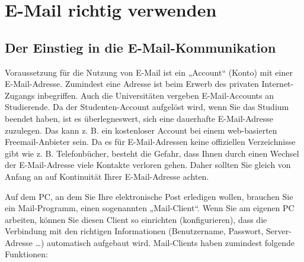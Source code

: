 \documentclass[]{book}
\theoremstyle{definition}
\theoremstyle{definition}
\theoremstyle{definition}
\theoremstyle{remark}
\begin{document}
\section{E-Mail richtig verwenden}\label{e-mail-richtig-verwenden}

\subsection{Der Einstieg in die
E-Mail-Kommunikation}\label{der-einstieg-in-die-e-mail-kommunikation}

Voraussetzung für die Nutzung von E-Mail ist ein „Account`` (Konto) mit
einer E-Mail-Adresse. Zumindest eine Adresse ist beim Erwerb des
privaten Internet-Zugangs inbegriffen. Auch die Universitäten vergeben
E-Mail-Accounts an Studierende. Da der Studenten-Account aufgelöst wird,
wenn Sie das Studium beendet haben, ist es überlegneswert, sich eine
dauerhafte E-Mail-Adresse zuzulegen. Das kann z. B. ein kostenloser
Account bei einem web-basierten Freemail-Anbieter sein. Da es für
E-Mail-Adressen keine offiziellen Verzeichnisse gibt wie z. B.
Telefonbücher, besteht die Gefahr, dass Ihnen durch einen Wechsel der
E-Mail-Adresse viele Kontakte verloren gehen. Daher sollten Sie gleich
von Anfang an auf Kontinuität Ihrer E-Mail-Adresse achten.

Auf dem PC, an dem Sie Ihre elektronische Post erledigen wollen,
brauchen Sie ein Mail-Programm, einen sogenannten „Mail-Client``. Wenn
Sie am eigenen PC arbeiten, können Sie diesen Client so einrichten
(konfigurieren), dass die Verbindung mit den richtigen Informationen
(Benutzername, Passwort, Server-Adresse \ldots{}) automatisch aufgebaut
wird. Mail-Clients haben zumindest folgende Funktionen:
\end{document}
